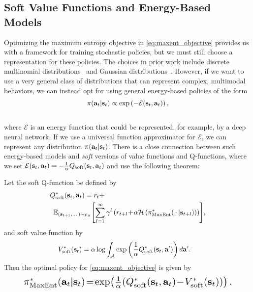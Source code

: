 \documentclass{article}
\begin{document}
\vspace{-1mm}
\subsection{Soft Value Functions and Energy-Based Models}
\vspace{-1mm}
Optimizing the maximum entropy objective in \autoref{eq:maxent_objective} 
provides us with a framework for training stochastic policies, but we must still choose a representation for these policies. The choices in prior work include discrete multinomial distributions~\cite{o2016pgq} and Gaussian distributions~\cite{rawlik2012stochastic}. However, if we want to use a very general class of distributions that can represent complex, multimodal behaviors, we can instead opt for using general energy-based policies of the form
\vspace{-0mm}
\begin{equation}
\pi({\mathbf{a}_t}|{\mathbf{s}_t}) \propto \exp\left(-\mathcal{E}({\mathbf{s}_t},{\mathbf{a}_t})\right),
\end{equation}
\vspace{-3mm}\\
where $\mathcal{E}$ is an energy function that could be represented, for example, by a deep neural network. If we use a universal function approximator for $\mathcal{E}$, we can represent any distribution $\pi({\mathbf{a}_t}|{\mathbf{s}_t})$. There is a close connection between such energy-based models and \emph{soft} versions of value functions and Q-functions, where we set $\mathcal{E}({\mathbf{s}_t},{\mathbf{a}_t}) = -\frac{1}{\alpha}Q_\mathrm{soft}({\mathbf{s}_t},{\mathbf{a}_t})$ and use the following theorem:
\begin{theorem}
\label{the:ebm}
Let the soft Q-function be defined by 
\begin{align}
&\Qsoft\opt(\st, \at) = \reward_t + \label{eq:soft_state_action_value}\\
&\ \E{(\stp,\dots)\sim\rho_\policy\!}{\sum_{l=1}^\infty\discount^l\left(\reward_{t+l}\! +\! \temp\entropy\left(\policy\opt_\mathrm{MaxEnt}(\sdots|\state_{t+l})\right)\right)}\!,\notag
\end{align}
and soft value function by 
\vspace{-2mm}
\begin{align}
&V_\mathrm{soft}^*({\mathbf{s}_t}) = \alpha\log\int_{\mathcal{A}} \exp\left(\frac{1}{\alpha}Q_\mathrm{soft}^*({\mathbf{s}_t}, \mathbf{a}')\right)d\mathbf{a}'.
\label{eq:soft_value}
\end{align}
Then the optimal policy for \autoref{eq:maxent_objective} is given by
\begin{equation}
\resizebox{0.88\hsize}{!}{$\policy\opt_\mathrm{MaxEnt}(\at|\st)\! =\! \exp\!\left(\frac{1}{\temp}\!\left(\Qsoft\opt(\st, \at)\! -\! \Vsoft\opt(\st)\right)\right).$}
\label{eq:softpolicy}
\end{equation}
\end{theorem}
\end{document}
